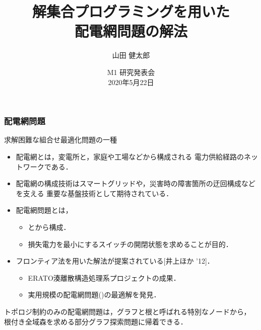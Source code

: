 \documentclass[dvipdfmx,11pt]{beamer}
\title{解集合プログラミングを用いた\\配電網問題の解法}
\author{山田 健太郎}
\date{M1 研究発表会\\2020年5月22日}
\institute{番原研究室}
\begin{document}
\begin{frame}\frametitle{}
  \titlepage
\end{frame}

\begin{frame}\frametitle{配電網問題}
 \begin{alertblock}{}
  \centering
  求解困難な組合せ最適化問題の一種
 \end{alertblock}

 \begin{itemize}
  \item  \alert{配電網}とは，変電所と，家庭や工場などから構成される
		 電力供給経路のネットワークである．
  \item  配電網の構成技術はスマートグリッドや，災害時の障害箇所の迂回構成などを支える
		 重要な基盤技術として期待されている．
  \item  \alert{配電網問題}とは，
		 \begin{itemize}
		  \item {}とから構成．
		  \item 損失電力を最小にするスイッチの開閉状態を求めることが目的．
		 \end{itemize}
  \item フロンティア法を用いた解法が提案されている[井上ほか '12]． 
		\begin{itemize}
		 \item ERATO湊離散構造処理系プロジェクトの成果．
		 \item 実用規模の配電網問題()の最適解を発見．
		\end{itemize}
 \end{itemize}

 \vspace{-0.25cm}
 \pause
 \begin{alertblock}{}
  トポロジ制約のみの配電網問題は，グラフと根と呼ばれる特別なノードから，
  \alert{根付き全域森}を求める部分グラフ探索問題に帰着できる．
 \end{alertblock}
  
\end{frame}
\end{document}
